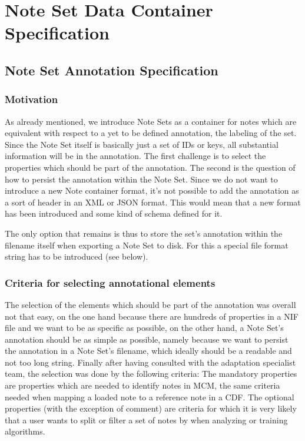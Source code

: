 \chapter{Note Set Data Container Specification}
\label{chap:technicaldocu}

\section{Note Set Annotation Specification}

\subsection{Motivation}
As already mentioned, we introduce Note Sets as a container for notes which are equivalent with respect to a yet to be defined annotation, the labeling of the set. Since the Note Set itself is basically just a set of IDs or keys, all substantial information will be in the annotation. The first challenge is to select the properties which should be part of the annotation. The second is the question of how to persist the annotation within the Note Set. Since we do not want to introduce a new Note container format, it's not possible to add the annotation as a sort of header in an XML or JSON format. This would mean that a new format has been introduced and some kind of schema defined for it. \par
The only option that remains is thus to store the set's annotation within the filename itself when exporting a Note Set to disk. For this a special file format string has to be introduced (see below).
\subsection{Criteria for selecting annotational elements}
The selection of the elements which should be part of the annotation was overall not that easy, on the one hand because there are hundreds of properties in a NIF file and we want to be as specific as possible, on the other hand, a Note Set's annotation should be as simple as possible, namely because we want to persist the annotation in a Note Set's filename, which ideally should be a readable and not too long string.
Finally after having consulted with the adaptation specialist team, the selection was done by the following criteria: The mandatory properties are properties which are needed to identify notes in MCM, the same criteria needed when mapping a loaded note to a reference note in a CDF. The optional properties (with the exception of comment) are criteria for which it is very likely that a user wants to split or filter a set of notes by when analyzing or training algorithms.
